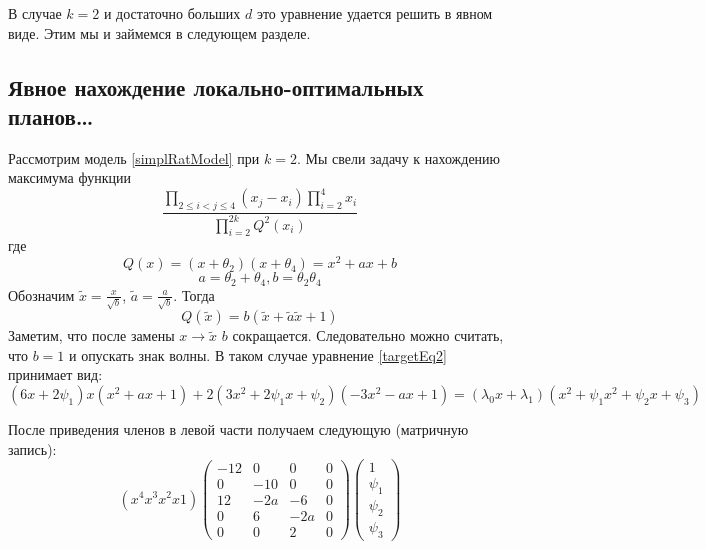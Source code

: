 В случае $k=2$ и достаточно больших $d$ это уравнение удается решить в явном виде. Этим мы и займемся в следующем разделе.
\subsection{Явное нахождение локально-оптимальных планов…}

Рассмотрим модель \eqref{simplRatModel} при $k=2$. Мы свели задачу к нахождению максимума функции
\begin{equation}
\frac{\prod\limits_{2\leq i < j \leq 4} (x_j - x_i) \prod\limits_{i=2}^4x_i}{\prod\limits_{i=2}^{2k}Q^2(x_i)}
\end{equation}
где  
$$Q(x) = (x+\theta_2)(x+\theta_4) = x^2 + ax + b$$
$$ a= \theta_2 + \theta_4, b = \theta_2\theta_4$$
Обозначим $\tilde{x} = \frac{x}{\sqrt{b}}$, $\tilde{a} = \frac{a}{\sqrt{b}}$. Тогда 
$$ Q(\tilde{x}) = b(\tilde{x} + \tilde{a}\tilde{x} + 1)$$
Заметим, что после замены $x \rightarrow \tilde{x}$  $b$ сокращается. Следовательно можно считать, что $b=1$ и опускать знак волны.  В таком случае уравнение \eqref{targetEq2} принимает вид:
\begin{equation}
(6x + 2 \psi_{1})x(x^2 + ax + 1) + 2(3x^2 + 2\psi_1 x + \psi_2) (-3x^2 - ax +1) = (\lambda_0 x + \lambda_1)(x^2 + \psi_1x^2+\psi_2 x + \psi_3)
\end{equation}

После приведения членов в левой части получаем следующую (матричную запись):
\begin{equation}
(x^4 x^3 x^2 x 1) \begin{pmatrix} -12 & 0 & 0 & 0 \\ 0 & -10 & 0 & 0 \\ 12 & -2a & -6 & 0 \\ 0 & 6 & -2a & 0 \\ 0 & 0 & 2 & 0 \end{pmatrix}  \begin{pmatrix} 1 \\ \psi_1 \\ \psi_2 \\ \psi_3 \end{pmatrix}
\end{equation}

